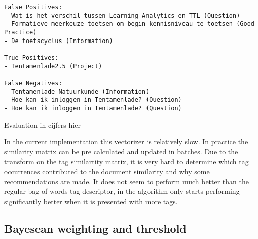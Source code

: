 \begin{lstlisting}
False Positives:
- Wat is het verschil tussen Learning Analytics en TTL (Question)
- Formatieve meerkeuze toetsen om begin kennisniveau te toetsen (Good Practice)
- De toetscyclus (Information)

True Positives:
- Tentamenlade2.5 (Project)

False Negatives:
- Tentamenlade Natuurkunde (Information)
- Hoe kan ik inloggen in Tentamenlade? (Question)
- Hoe kan ik inloggen in Tentamenlade? (Question)
\end{lstlisting}

Evaluation in cijfers hier

In the current implementation this vectorizer is relatively slow. In practice the similarity matrix can be pre calculated and updated in batches. Due to the transform on the tag similartity matrix, it is very hard to determine which tag occurrences contributed to the document similarity and why some recommendations are made. It does not seem to perform much better than the regular bag of words tag descriptor, in \citeauthor{zhou2011web} the algorithm only starts performing significantly better when it is presented with more tags.

\subsection{Bayesean weighting and threshold}
